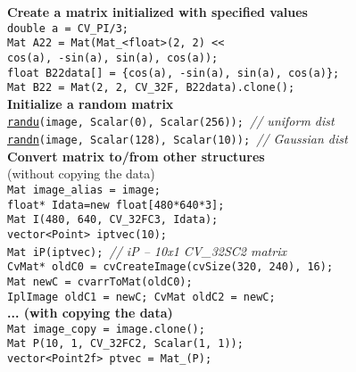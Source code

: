 \documentclass[10pt,landscape]{article}
\begin{document}
\begin{multicols}{3}
\begin{tabbing}
\textbf{Create a matrix initialized with specified values}\\
\> \texttt{double a = CV\_PI/3;} \\
\> \texttt{Mat A22 = Mat(Mat\_<float>(2, 2) <<} \\
\> \> \texttt{cos(a), -sin(a), sin(a), cos(a));} \\
\> \texttt{float B22data[] = \{cos(a), -sin(a), sin(a), cos(a)\};} \\
\> \texttt{Mat B22 = Mat(2, 2, CV\_32F, B22data).clone();}\\

\textbf{Initialize a random matrix}\\
\> \texttt{\href{http://opencv.willowgarage.com/documentation/cpp/operations_on_arrays.html\#cv-randu}{randu}(image, Scalar(0), Scalar(256)); }\textit{// uniform dist}\\
\> \texttt{\href{http://opencv.willowgarage.com/documentation/cpp/operations_on_arrays.html\#cv-randn}{randn}(image, Scalar(128), Scalar(10)); }\textit{// Gaussian dist}\\

\textbf{Convert matrix to/from other structures}\\
\>(without copying the data)\\
\> \texttt{Mat image\_alias = image;}\\
\> \texttt{float* Idata=new float[480*640*3];}\\
\> \texttt{Mat I(480, 640, CV\_32FC3, Idata);}\\
\> \texttt{vector<Point> iptvec(10);}\\
\> \texttt{Mat iP(iptvec); }\textit{// iP -- 10x1 CV\_32SC2 matrix}\\
\> \texttt{CvMat* oldC0 = cvCreateImage(cvSize(320, 240), 16);}\\
\> \texttt{Mat newC = cvarrToMat(oldC0);}\\
\> \texttt{IplImage oldC1 = newC; CvMat oldC2 = newC;}\\

\textbf{... (with copying the data)}\\
\> \texttt{Mat image\_copy = image.clone();}\\
\> \texttt{Mat P(10, 1, CV\_32FC2, Scalar(1, 1));}\\
\> \texttt{vector<Point2f> ptvec = Mat\_<Point2f>(P);}\\


\end{tabbing}
\end{multicols}
\end{document}
